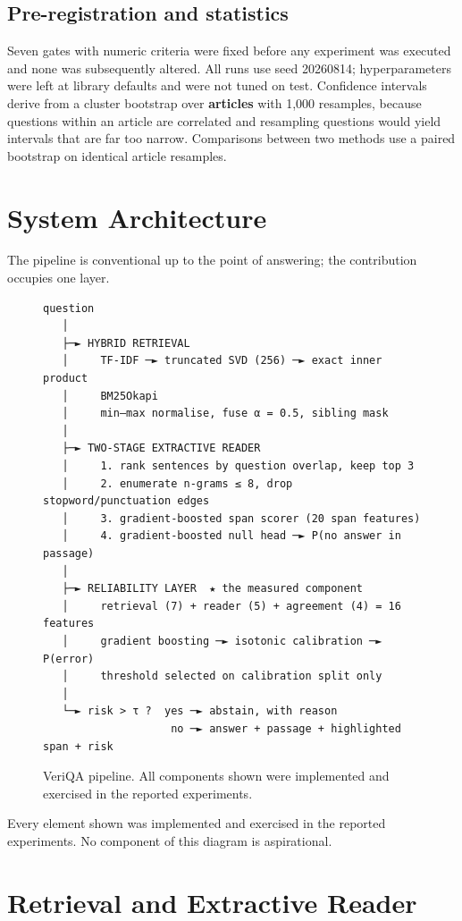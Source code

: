 \documentclass[conference]{IEEEtran}
\begin{document}
\subsection{Pre-registration and statistics}

Seven gates with numeric criteria were fixed before any experiment was executed and none was subsequently altered. All runs use seed 20260814; hyperparameters were left at library defaults and were not tuned on test. Confidence intervals derive from a cluster bootstrap over \textbf{articles} with 1,000 resamples, because questions within an article are correlated and resampling questions would yield intervals that are far too narrow. Comparisons between two methods use a paired bootstrap on identical article resamples.

\section{System Architecture}

The pipeline is conventional up to the point of answering; the contribution occupies one layer.

\begin{figure}[t]\centering\footnotesize\begin{verbatim}
question
   │
   ├─► HYBRID RETRIEVAL
   │     TF-IDF ─► truncated SVD (256) ─► exact inner product
   │     BM25Okapi
   │     min–max normalise, fuse α = 0.5, sibling mask
   │
   ├─► TWO-STAGE EXTRACTIVE READER
   │     1. rank sentences by question overlap, keep top 3
   │     2. enumerate n-grams ≤ 8, drop stopword/punctuation edges
   │     3. gradient-boosted span scorer (20 span features)
   │     4. gradient-boosted null head ─► P(no answer in passage)
   │
   ├─► RELIABILITY LAYER  ★ the measured component
   │     retrieval (7) + reader (5) + agreement (4) = 16 features
   │     gradient boosting ─► isotonic calibration ─► P(error)
   │     threshold selected on calibration split only
   │
   └─► risk > τ ?  yes ─► abstain, with reason
                    no ─► answer + passage + highlighted span + risk
\end{verbatim}\caption{VeriQA pipeline. All components shown were implemented and exercised in the reported experiments.}\label{fig:arch}\end{figure}

Every element shown was implemented and exercised in the reported experiments. No component of this diagram is aspirational.

\section{Retrieval and Extractive Reader}
\end{document}
